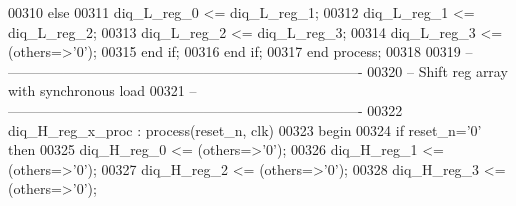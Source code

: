 \begin{DoxyCode}
00310          \textcolor{keywordflow}{else} 
00311             \textcolor{vhdlchar}{diq_L_reg_0} \textcolor{vhdlchar}{<=} \textcolor{vhdlchar}{diq_L_reg_1};
00312             \textcolor{vhdlchar}{diq_L_reg_1} \textcolor{vhdlchar}{<=} \textcolor{vhdlchar}{diq_L_reg_2};
00313             \textcolor{vhdlchar}{diq_L_reg_2} \textcolor{vhdlchar}{<=} \textcolor{vhdlchar}{diq_L_reg_3};
00314             \textcolor{vhdlchar}{diq_L_reg_3} \textcolor{vhdlchar}{<=} \textcolor{vhdlchar}{(}\textcolor{keywordflow}{others}\textcolor{vhdlchar}{=}\textcolor{vhdlchar}{>}\textcolor{vhdlchar}{'}\textcolor{vhdllogic}{}\textcolor{vhdllogic}{0}\textcolor{vhdlchar}{'}\textcolor{vhdlchar}{)};
00315          \textcolor{keywordflow}{end} \textcolor{keywordflow}{if}; 
00316       \textcolor{keywordflow}{end} \textcolor{keywordflow}{if};
00317 \textcolor{keywordflow}{end} \textcolor{keywordflow}{process};
00318      
00319 \textcolor{keyword}{-- ----------------------------------------------------------------------------}
00320 \textcolor{keyword}{-- Shift reg array with synchronous load }
00321 \textcolor{keyword}{-- ----------------------------------------------------------------------------}
00322 diq\_H\_reg\_x\_proc : \textcolor{keywordflow}{process}(reset_n, clk)
00323 \textcolor{vhdlkeyword}{   begin}
00324       \textcolor{keywordflow}{if} \textcolor{vhdlchar}{reset_n}\textcolor{vhdlchar}{=}\textcolor{vhdlchar}{'}\textcolor{vhdllogic}{}\textcolor{vhdllogic}{0}\textcolor{vhdlchar}{'} \textcolor{keywordflow}{then}
00325          \textcolor{vhdlchar}{diq_H_reg_0} \textcolor{vhdlchar}{<=} \textcolor{vhdlchar}{(}\textcolor{keywordflow}{others}\textcolor{vhdlchar}{=}\textcolor{vhdlchar}{>}\textcolor{vhdlchar}{'}\textcolor{vhdllogic}{}\textcolor{vhdllogic}{0}\textcolor{vhdlchar}{'}\textcolor{vhdlchar}{)};
00326          \textcolor{vhdlchar}{diq_H_reg_1} \textcolor{vhdlchar}{<=} \textcolor{vhdlchar}{(}\textcolor{keywordflow}{others}\textcolor{vhdlchar}{=}\textcolor{vhdlchar}{>}\textcolor{vhdlchar}{'}\textcolor{vhdllogic}{}\textcolor{vhdllogic}{0}\textcolor{vhdlchar}{'}\textcolor{vhdlchar}{)};
00327          \textcolor{vhdlchar}{diq_H_reg_2} \textcolor{vhdlchar}{<=} \textcolor{vhdlchar}{(}\textcolor{keywordflow}{others}\textcolor{vhdlchar}{=}\textcolor{vhdlchar}{>}\textcolor{vhdlchar}{'}\textcolor{vhdllogic}{}\textcolor{vhdllogic}{0}\textcolor{vhdlchar}{'}\textcolor{vhdlchar}{)};
00328          \textcolor{vhdlchar}{diq_H_reg_3} \textcolor{vhdlchar}{<=} \textcolor{vhdlchar}{(}\textcolor{keywordflow}{others}\textcolor{vhdlchar}{=}\textcolor{vhdlchar}{>}\textcolor{vhdlchar}{'}\textcolor{vhdllogic}{}\textcolor{vhdllogic}{0}\textcolor{vhdlchar}{'}\textcolor{vhdlchar}{)};

\end{DoxyCode}
